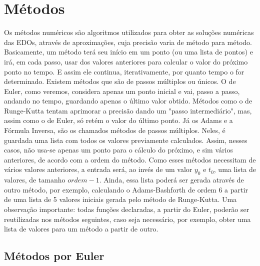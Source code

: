 \documentclass{article}
\begin{document}
\begin{otherlanguage}{brazil}
\section{Métodos}
    Os métodos numéricos são algoritmos utilizados para obter as soluções numéricas das EDOs, através de aproximações, cuja precisão varia de método para método. Basicamente, um método terá seu início em um ponto (ou uma lista de pontos) e irá, em cada passo, usar dos valores anteriores para calcular o valor do próximo ponto no tempo. E assim ele continua, iterativamente, por quanto tempo o for determinado. Existem métodos que são de passos múltiplos ou únicos. O de Euler, como veremos, considera apenas um ponto inicial e vai, passo a passo, andando no tempo, guardando apenas o último valor obtido. Métodos como o de Runge-Kutta tentam aprimorar a precisão dando um "passo intermediário", mas, assim como o de Euler, só retém o valor do último ponto.\newline
    Já os Adams e a Fórmula Inversa, são os chamados métodos de passos múltiplos. Neles, é guardada uma lista com todos os valores previamente calculados. Assim, nesses casos, não usa-se apenas um ponto para o cálculo do próximo, e sim vários anteriores, de acordo com a ordem do método.\newline
    Como esses métodos necessitam de vários valores anteriores, a entrada será, ao invés de um valor $y_0$ e $t_0$, uma lista de valores, de tamanho $ordem - 1$. Ainda, essa lista poderá ser gerada através de outro método, por exemplo, calculando o Adams-Bashforth de ordem 6 a partir de uma lista de 5 valores iniciais gerada pelo método de Runge-Kutta.
    Uma observação importante: todas funções declaradas, a partir do Euler, poderão ser reutilizadas nos métodos seguintes, caso seja necessário, por exemplo, obter uma lista de valores para um método a partir de outro.
    
    \subsection{Métodos por Euler}

\end{otherlanguage}
\end{document}
